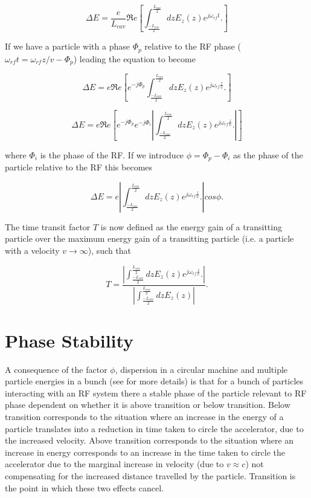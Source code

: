 \begin{equation}
\Delta E = \frac{e}{L_{cav}} \Re{}e \left[ \int^{\frac{L_{cav}}{2}}_{\frac{-L_{cav}}{2}} dz E_{z}\left( z \right)e^{j \omega_{rf} t}.\right]
\end{equation}

If we have a particle with a phase $\Phi_{p}$ relative to the RF phase ($\omega_{rf}t = \omega_{rf}z/v - \Phi_{p}$) leading the equation to become

\begin{equation}
\Delta E = e \Re{}e \left[ e^{-j \Phi_{p}}\int^{\frac{L_{cav}}{2}}_{\frac{-L_{cav}}{2}} dz E_{z}\left( z \right) e^{j \omega_{rf} \frac{z}{v}}.\right]
\end{equation}

\begin{equation}
\Delta E = e \Re{}e \left[ e^{-j \Phi_{p}} e^{-j \Phi_{i}} \left| \int^{\frac{L_{cav}}{2}}_{\frac{-L_{cav}}{2}} dz E_{z}\left( z \right) e^{j \omega_{rf} \frac{z}{v}}.\right| \right]
\end{equation}

where $\Phi_{i}$ is the phase of the RF. If we introduce $\phi = \Phi_{p} - \Phi_{i}$ as the phase of the particle relative to the RF this becomes

\begin{equation}
\Delta E = e  \left| \int^{\frac{L_{cav}}{2}}_{\frac{-L_{cav}}{2}} dz E_{z}\left( z \right) e^{j \omega_{rf} \frac{z}{v}}.\right| cos \phi.
\end{equation}

The time transit factor $T$ is now defined as the energy gain of a transitting particle over the maximum energy gain of a transitting particle (i.e. a particle with a velocity $v \rightarrow \infty $), such that 

\begin{equation}
T =    \frac{\left| \int^{\frac{L_{cav}}{2}}_{\frac{-L_{cav}}{2}} dz E_{z}\left( z \right) e^{j \omega_{rf} \frac{z}{v}}.\right|}{  \left| \int^{\frac{L_{cav}}{2}}_{\frac{-L_{cav}}{2}} dz E_{z}\left( z \right) \right|}.
\end{equation}

\section{Phase Stability}

A consequence of the factor $\phi$, dispersion in a circular machine and multiple particle energies in a bunch (see \cite{Leduff:LongDyn} for more details) is that for a bunch of particles interacting with an RF system there a stable phase of the particle relevant to RF phase dependent on whether it is above transition or below transition. Below transition corresponds to the situation where an increase in the energy of a particle translates into a reduction in time taken to circle the accelerator, due to the increased velocity. Above transition corresponds to the situation where an increase in energy corresponds to an increase in the time taken to circle the accelerator due to the marginal increase in velocity (due to $v \approx c$) not compensating for the increased distance travelled by the particle. Transition is the point in which these two effects cancel.

